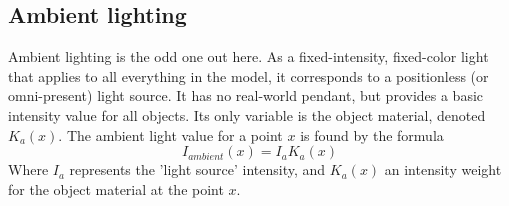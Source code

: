 \subsection{Ambient lighting}
Ambient lighting is the odd one out here. As a fixed-intensity, fixed-color
light that applies to all everything in the model, it corresponds to a
positionless (or omni-present) light source. It has no real-world pendant, but
provides a basic intensity value for all objects. Its only variable is the
object material, denoted $K_{a}(x)$. The ambient light value for a point $x$ is
found by the formula $$I_{ambient}(x) = I_{a}K_{a}(x)$$ Where $I_{a}$
represents the 'light source' intensity, and $K_{a}(x)$ an intensity weight for
the object material at the point $x$.
